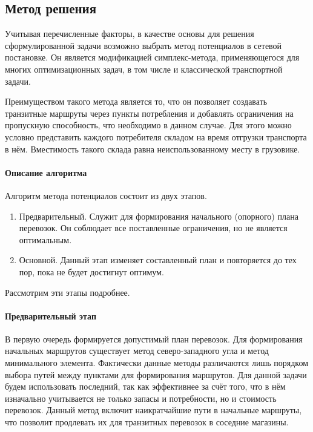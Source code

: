 \subsection{Метод решения}
	Учитывая перечисленные факторы, в качестве основы для решения сформулированной задачи возможно выбрать метод потенциалов в сетевой постановке. Он является модификацией симплекс-метода, применяющегося для многих оптимизационных задач, в том числе и классической транспортной задачи\cite{trans:potential}.
		
	Преимуществом такого метода является то, что он позволяет создавать транзитные маршруты через пункты потребления и добавлять ограничения на пропускную способность, что необходимо в данном случае. Для этого можно условно представить каждого потребителя складом на время отгрузки транспорта в нём. Вместимость такого склада равна неиспользованному месту в грузовике.
	
	\paragraph{Описание алгоритма}
	
	Алгоритм метода потенциалов состоит из двух этапов.
	\begin{enumerate}
		\item Предварительный. Служит для формирования начального (опорного) плана перевозок. Он соблюдает все поставленные ограничения, но не является оптимальным.
		\item Основной. Данный этап изменяет составленный план и повторяется до тех пор, пока не будет достигнут оптимум.
	\end{enumerate} 

	Рассмотрим эти этапы подробнее.
	
	\paragraph{Предварительный этап}
	
	В первую очередь формируется допустимый план перевозок. Для формирования начальных маршрутов существует метод северо-западного угла и метод минимального элемента\cite{trans:comporation}. Фактически данные методы различаются лишь порядком выбора путей между пунктами для формирования маршрутов. Для данной задачи будем использовать последний, так как эффективнее \cite{potential:polyindex} за счёт того, что в нём изначально учитывается не только запасы и потребности, но и стоимость перевозок. Данный метод включит наикратчайшие пути в начальные маршруты, что позволит продлевать их  для транзитных перевозок в соседние магазины.
	
